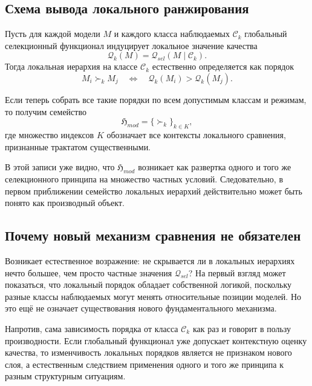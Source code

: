 \documentclass[12pt,a4paper]{article}
\begin{document}
\subsection{Схема вывода локального ранжирования}

Пусть для каждой модели \(M\) и каждого класса наблюдаемых \(\mathcal{C}_k\) глобальный селекционный функционал индуцирует локальное значение качества
\begin{equation}
\mathcal{Q}_k(M)=\mathcal{Q}_{sel}(M\mid \mathcal{C}_k).
\end{equation}
Тогда локальная иерархия на классе \(\mathcal{C}_k\) естественно определяется как порядок
\begin{equation}
M_i \succ_k M_j \quad \Longleftrightarrow \quad \mathcal{Q}_k(M_i)>\mathcal{Q}_k(M_j).
\end{equation}

Если теперь собрать все такие порядки по всем допустимым классам и режимам, то получим семейство
\begin{equation}
\mathfrak{H}_{mod}=\bigl\{\succ_k\bigr\}_{k\in K},
\end{equation}
где множество индексов \(K\) обозначает все контексты локального сравнения, признанные трактатом существенными.

В этой записи уже видно, что \(\mathfrak{H}_{mod}\) возникает как развертка одного и того же селекционного принципа на множество частных условий. Следовательно, в первом приближении семейство локальных иерархий действительно может быть понято как производный объект.

\subsection{Почему новый механизм сравнения не обязателен}

Возникает естественное возражение: не скрывается ли в локальных иерархиях нечто большее, чем просто частные значения \(\mathcal{Q}_{sel}\)? На первый взгляд может показаться, что локальный порядок обладает собственной логикой, поскольку разные классы наблюдаемых могут менять относительные позиции моделей. Но это ещё не означает существования нового фундаментального механизма.

Напротив, сама зависимость порядка от класса \(\mathcal{C}_k\) как раз и говорит в пользу производности. Если глобальный функционал уже допускает контекстную оценку качества, то изменчивость локальных порядков является не признаком нового слоя, а естественным следствием применения одного и того же принципа к разным структурным ситуациям.
\end{document}
